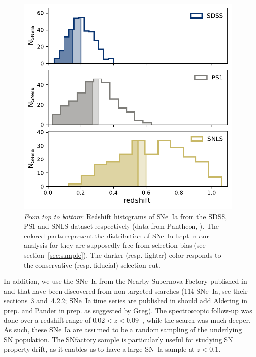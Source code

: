 \documentclass[]{aa} %
\newcommand{\mr}[1]{{\textcolor[rgb]{0.60,0.10,0.6}{#1}}}
\newcommand{\nn}[1]{{\textcolor[rgb]{0.25, 0.50, 0}{#1}}}
\begin{document}
\begin{figure}
    \centering
    \includegraphics[width=0.95\linewidth]{Article_figures/hist_surveys_cuts_55-cividis.pdf}
    \caption{\textit{From top to bottom}: Redshift histograms of SNe~Ia from
        the SDSS, PS1 and SNLS dataset respectively (data from Pantheon,
        \citealt{scolnic2018a}).  The colored parts represent the distribution
        of SNe~Ia kept in our analysis for they are supposedly free from
        selection bias (see section~\ref{sec:sample}). The darker (resp. lighter)
    color responds to the conservative (resp. fiducial) selection cut.}
    \label{fig:cuts}
\end{figure}

In addition, we use the SNe~Ia from the Nearby Supernova Factory
\citep[SNfactory,][]{aldering2002} published in \cite{rigault2018} and that have
been discovered from non-targeted searches (114 SNe~Ia, see their sections~3
and~4.2.2; \mr{SNe~Ia time series are published in \citealt{Saunders2020}}
\nn{should add Aldering in prep. and Pander in prep. as suggested by Greg}). The
spectroscopic follow-up was done over a redshift range of $0.02 < z <
0.09$~\citep[as in][]{rigault2018}, while the search was much deeper. As such,
these SNe~Ia are assumed to be a random sampling of the underlying SN
population. The SNfactory sample is particularly useful for studying SN property
drift, as it enables us to have a large SN~Ia sample at $z<0.1$.  
\end{document}
